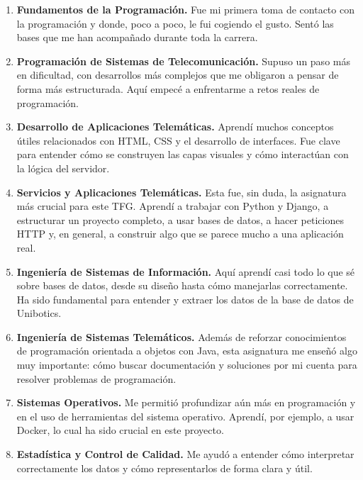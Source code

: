 \documentclass[a4paper, 12pt]{book}
\begin{document}
\begin{enumerate}
  
    \item \textbf{Fundamentos de la Programación.} Fue mi primera toma de contacto con la programación y donde, poco a poco, le fui cogiendo el gusto. Sentó las bases que me han acompañado durante toda la carrera.

    \item \textbf{Programación de Sistemas de Telecomunicación.} Supuso un paso más en dificultad, con desarrollos más complejos que me obligaron a pensar de forma más estructurada. Aquí empecé a enfrentarme a retos reales de programación.

    \item \textbf{Desarrollo de Aplicaciones Telemáticas.} Aprendí muchos conceptos útiles relacionados con HTML, CSS y el desarrollo de interfaces. Fue clave para entender cómo se construyen las capas visuales y cómo interactúan con la lógica del servidor.

    \item \textbf{Servicios y Aplicaciones Telemáticas.} Esta fue, sin duda, la asignatura más crucial para este TFG. Aprendí a trabajar con Python y Django, a estructurar un proyecto completo, a usar bases de datos, a hacer peticiones HTTP y, en general, a construir algo que se parece mucho a una aplicación real. 

    \item \textbf{Ingeniería de Sistemas de Información.} Aquí aprendí casi todo lo que sé sobre bases de datos, desde su diseño hasta cómo manejarlas correctamente. Ha sido fundamental para entender y extraer los datos de la base de datos de Unibotics.

    \item \textbf{Ingeniería de Sistemas Telemáticos.} Además de reforzar conocimientos de programación orientada a objetos con Java, esta asignatura me enseñó algo muy importante: cómo buscar documentación y soluciones por mi cuenta para resolver problemas de programación.

    \item \textbf{Sistemas Operativos.} Me permitió profundizar aún más en programación y en el uso de herramientas del sistema operativo. Aprendí, por ejemplo, a usar Docker, lo cual ha sido crucial en este proyecto.

    \item \textbf{Estadística y Control de Calidad.} Me ayudó a entender cómo interpretar correctamente los datos y cómo representarlos de forma clara y útil.

\end{enumerate}
\end{document}
